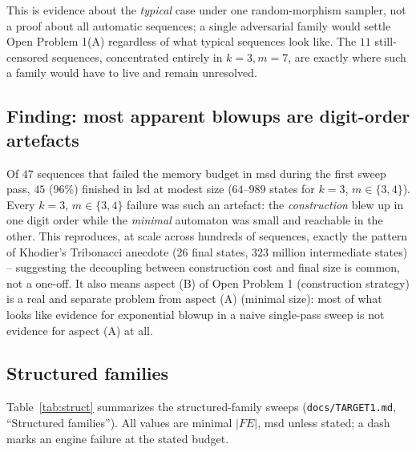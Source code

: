 \documentclass[11pt]{article}
\begin{document}
This is evidence about the \emph{typical} case under one random-morphism sampler, not a
proof about all automatic sequences; a single adversarial family would settle Open
Problem 1(A) regardless of what typical sequences look like. The $11$ still-censored
sequences, concentrated entirely in $k=3,m=7$, are exactly where such a family would have
to live and remain unresolved.

\subsection{Finding: most apparent blowups are digit-order artefacts}

Of $47$ sequences that failed the memory budget in msd during the first sweep pass,
$45$ (96\%) finished in lsd at modest size ($64$--$989$ states for $k=3$, $m\in\{3,4\}$).
Every $k=3$, $m\in\{3,4\}$ failure was such an artefact: the \emph{construction} blew up
in one digit order while the \emph{minimal} automaton was small and reachable in the
other. This reproduces, at scale across hundreds of sequences, exactly the pattern of
Khodier's Tribonacci anecdote (26 final states, 323 million intermediate states) --
suggesting the decoupling between construction cost and final size is common, not a
one-off. It also means aspect (B) of Open Problem 1 (construction strategy) is a real and
separate problem from aspect (A) (minimal size): most of what looks like evidence for
exponential blowup in a naive single-pass sweep is not evidence for aspect (A) at all.

\subsection{Structured families}

Table~\ref{tab:struct} summarizes the structured-family sweeps
(\texttt{docs/TARGET1.md}, ``Structured families''). All values are minimal $|FE|$, msd
unless stated; a dash marks an engine failure at the stated budget.
\end{document}
